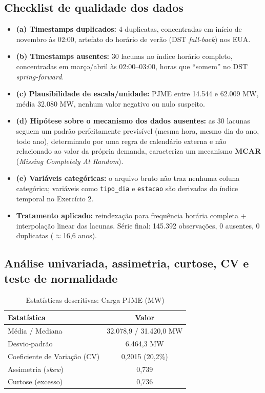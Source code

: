 \documentclass[12pt,a4paper]{article}
\begin{document}
\subsection{Checklist de qualidade dos dados}

\begin{itemize}
    \item \textbf{(a) Timestamps duplicados:} 4 duplicatas, concentradas em início de novembro às 02:00, artefato do horário de verão (DST \emph{fall-back}) nos EUA.
    \item \textbf{(b) Timestamps ausentes:} 30 lacunas no índice horário completo, concentradas em março/abril às 02:00--03:00, horas que ``somem'' no DST \emph{spring-forward}.
    \item \textbf{(c) Plausibilidade de escala/unidade:} PJME entre 14.544 e 62.009 MW, média 32.080 MW, nenhum valor negativo ou nulo suspeito.
    \item \textbf{(d) Hipótese sobre o mecanismo dos dados ausentes:} as 30 lacunas seguem um padrão perfeitamente previsível (mesma hora, mesmo dia do ano, todo ano), determinado por uma regra de calendário externa e não relacionado ao valor da própria demanda, caracteriza um mecanismo \textbf{MCAR} (\emph{Missing Completely At Random}).
    \item \textbf{(e) Variáveis categóricas:} o arquivo bruto não traz nenhuma coluna categórica; variáveis como \texttt{tipo\_dia} e \texttt{estacao} são derivadas do índice temporal no Exercício 2.
    \item \textbf{Tratamento aplicado:} reindexação para frequência horária completa + interpolação linear das lacunas. Série final: 145.392 observações, 0 ausentes, 0 duplicatas ($\approx$16,6 anos).
\end{itemize}

\subsection{Análise univariada, assimetria, curtose, CV e teste de normalidade}

\begin{table}[H]
\centering
\caption{Estatísticas descritivas: Carga PJME (MW)}
\begin{tabular}{lc}
\toprule
Estatística & Valor \\
\midrule
Média / Mediana        & 32.078,9 / 31.420,0 MW \\
Desvio-padrão          & 6.464,3 MW \\
Coeficiente de Variação (CV) & 0{,}2015 (20{,}2\%) \\
Assimetria (\emph{skew})     & 0{,}739 \\
Curtose (excesso)     & 0{,}736 \\
\bottomrule
\end{tabular}
\end{table}
\end{document}
